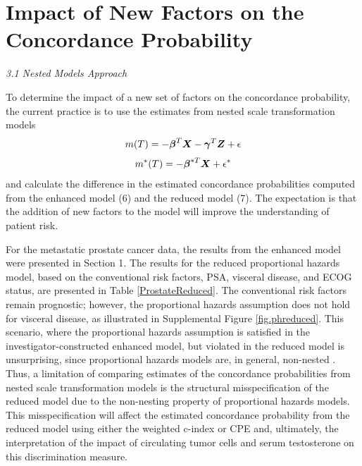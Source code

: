 \documentclass[12pt]{article}
\newcommand{\bmX}{\mbox{\boldmath $X$}}
\newcommand{\bg}{\mbox{\boldmath $\gamma$}}
\newcommand{\bb}{\mbox{\boldmath $\beta$}}
\newcommand{\bmZ}{\mbox{\boldmath $Z$}}
\begin{document}



\vskip 0.50in

\section{Impact of New Factors on the Concordance Probability} 

{\it 3.1 Nested Models Approach}

\noindent To determine the impact of a new set of factors on the concordance probability, the current practice is to use the estimates from nested scale transformation models 
\begin{equation} m(T) = -\bb^T \bmX - \bg^T \bmZ +\epsilon \end{equation}
\begin{equation} m^*(T) = -\bb^{*T} \bmX + \epsilon^* \end{equation}
and calculate the difference in the estimated concordance probabilities computed from the enhanced model (6) and the reduced model (7). The expectation is that the addition of new factors to the model will improve the understanding of patient risk. 

For the metastatic prostate cancer data, the results from the enhanced model were presented in Section 1. The results for the reduced proportional hazards model, based on the conventional risk factors, PSA, visceral disease, and ECOG status, are presented in Table \ref{ProstateReduced}. The conventional risk factors remain prognostic; however, the proportional hazards assumption does not hold for visceral disease, as illustrated in Supplemental Figure \ref{fig.phreduced}. This scenario, where the proportional hazards assumption is satisfied in the investigator-constructed enhanced model, but violated in the reduced model is unsurprising, since proportional hazards models are, in general, non-nested \citep{Hougaard1986, Fine2002}. Thus, a limitation of comparing estimates of the concordance probabilities from nested scale transformation models is the structural misspecification of the reduced model due to the non-nesting property of proportional hazards models. This misspecification will affect the estimated concordance probability from the reduced model using either the weighted c-index or CPE and, ultimately, the interpretation of the impact of circulating tumor cells and serum testosterone on this discrimination measure.  
\end{document}
